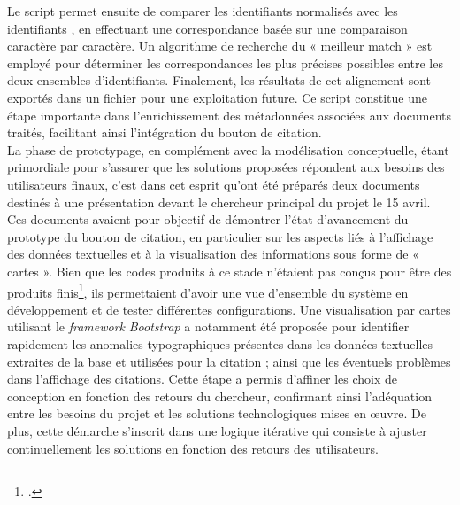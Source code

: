 Le script permet ensuite de comparer les identifiants \tei normalisés avec les identifiants \ead, en effectuant une correspondance basée sur une comparaison caractère par caractère. Un algorithme de recherche du « meilleur match » est employé pour déterminer les correspondances les plus précises possibles entre les deux ensembles d’identifiants. Finalement, les résultats de cet alignement sont exportés dans un fichier \csv pour une exploitation future. Ce script constitue une étape importante dans l'enrichissement des métadonnées associées aux documents traités, facilitant ainsi l’intégration du bouton de citation.
\newline
{}\\

La phase de prototypage, en complément avec la modélisation conceptuelle, étant primordiale pour s’assurer que les solutions proposées répondent aux besoins des utilisateurs finaux, c’est dans cet esprit qu’ont été préparés deux documents destinés à une présentation devant le chercheur principal du projet le 15 avril. Ces documents avaient pour objectif de démontrer l’état d’avancement du prototype du bouton de citation, en particulier sur les aspects liés à l’affichage des données textuelles et à la visualisation des informations sous forme de « cartes ».
Bien que les codes produits à ce stade n’étaient pas conçus pour être des produits finis\footcite[p.3]{brown_design_2008}, ils permettaient d’avoir une vue d’ensemble du système en développement et de tester différentes configurations. Une visualisation par cartes utilisant le \textit{framework} \textit{Bootstrap} a notamment été proposée pour identifier rapidement les anomalies typographiques présentes dans les données textuelles extraites de la base et utilisées pour la citation ; ainsi que les éventuels problèmes dans l’affichage des citations.
Cette étape a permis d’affiner les choix de conception en fonction des retours du chercheur, confirmant ainsi l’adéquation entre les besoins du projet et les solutions technologiques mises en œuvre. De plus, cette démarche s’inscrit dans une logique itérative qui consiste à ajuster continuellement les solutions en fonction des retours des utilisateurs.
